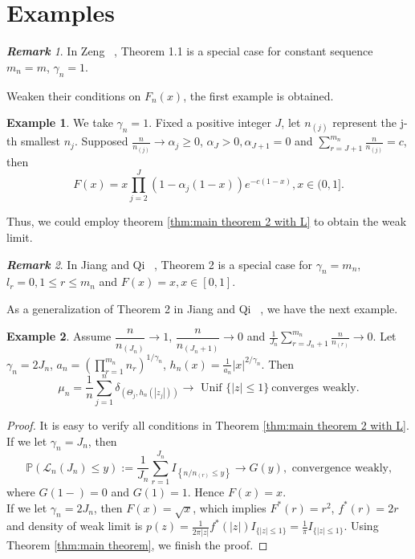 \documentclass[12pt]{article}
\theoremstyle{plain}
\theoremstyle{definition}
\newtheorem{exm}{\textbf{Example}}
\theoremstyle{remark}
\newtheorem{rem}{\textbf{Remark}}
\begin{document}
\section{Examples}

\begin{rem}
    In Zeng ~\cite{zeng2017}, Theorem 1.1 is a special case for constant sequence $m_n=m$,  $\gamma_{n}=1$.
 \end{rem}
Weaken their conditions on $F_n(x)$, the first example is obtained.
\begin{exm}\label{exm:4.1}
    We take $\gamma_n=1$. Fixed a positive integer $J$, let $n_{(j)}$ represent the j-th smallest $n_j$. Supposed $\frac{n}{n_{(j)}}\rightarrow \alpha_j \geq 0$, $\alpha _J>0,  \alpha_{J+1}=0$ and $\sum_{r=J+1}^{m_n} \frac{n}{n_{(j)}}=c$, then
    \begin{equation}
    F(x)=x\prod_{j=2}^{J}\left(1-\alpha_j(1-x)\right)e^{-c(1-x)},x\in (0,1].
    \end{equation}
    
    Thus, we could employ theorem \ref{thm:main theorem 2 with L} to obtain the weak limit. 
\end{exm}


\begin{rem}
    In Jiang and Qi ~\cite{JiangQi2019}, Theorem 2 is a special case for $\gamma_n=m_n$, $l_r=0, 1\leq r\leq m_n$ and $F(x)=x, x\in [0,1]$.
\end{rem}
As a generalization of Theorem 2 in Jiang and Qi ~\cite{JiangQi2019}, we have the next example.
\begin{exm}\label{exm:Jiang and Qi}
    Assume $\dfrac{n}{n_{(J_n)}}\rightarrow 1$, $\dfrac{n}{n_{(J_n+1)}}\rightarrow 0$ and $\frac{1}{J_{n}} \sum_{r=J_{n}+1}^{m_n} \frac{n}{n_{(r)}} \rightarrow 0$. Let $\gamma_{n}=2J_n$, $a_{n}=\left(\prod_{r=1}^{m_n}n_{r}\right)^{1 / \gamma_{n}}$, $h_{n}(x)=\frac{1}{a_{n}}|x|^{2 / \gamma_{n}}$. Then
    \begin{equation*}
    \mu_{n}=\frac{1}{n} \sum_{j=1}^{n} \delta_{\left(\Theta_{j}, h_{n}\left(\left|z_{j}\right|\right)\right)}\rightarrow \text { Unif }\{|z| \leq 1\}\ \text{converges weakly}.
    \end{equation*}
\end{exm}
\begin{proof}
    It is easy to verify all conditions in Theorem \ref{thm:main theorem 2 with L}. If we let $\gamma_{n}=J_n$, then
    \begin{equation*}
    \mathbb{P}\left(\mathscr{L}_{n}\left(J_{n}\right) \leqslant y\right) :=\frac{1}{J_{n}} \sum_{r=1}^{J_{n}} I_{\left\{n / n_{(r)} \leqslant y\right\}} \rightarrow G(y), \text { convergence weakly,}
    \end{equation*}
    where $G(1-)=0$ and $G(1)=1$. Hence $F(x)=x$. \\
    If we let $\gamma_{n}=2J_n$, then $F(x)=\sqrt x$, which implies $F^*(r)=r^2$, $f^*(r)=2r$ and density of weak limit is $p(z)=\frac{1}{2 \pi|z|} f^{*}(|z|)I_{\{|z|\leq 1\}}=\frac{1}{\pi}I_{\{|z|\leq 1\}}$. Using Theorem \ref{thm:main theorem}, we finish the proof.
\end{proof}
\end{document}
